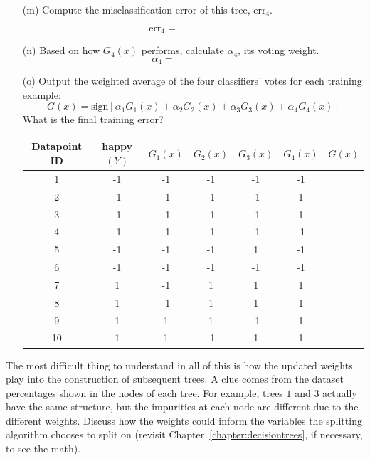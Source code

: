 \begin{enumerate}
\item[(m)] Compute the misclassification error of this tree, $\text{err}_4$. 

$$ \text{err}_4 = \qquad \qquad \qquad $$
\vspace{3mm}

\item[(n)] Based on how $G_4(x)$ performs, calculate $\alpha_4$, its voting weight.
$$ \alpha_4 = \qquad \qquad \qquad $$

\item[(o)] Output the weighted average of the four classifiers' votes for each training example:
$$ G(x) = \text{sign}\left[ \alpha_1 G_1(x) + \alpha_2 G_2(x) + \alpha_3 G_3(x) + \alpha_4 G_4(x) \right] $$ 
What is the final training error? 
\vspace{3mm}
{\small
\begin{center}
\begin{tabular}{cccccc|c}
\toprule
Datapoint ID & happy $(Y)$ & $G_1(x)$ & $G_2(x)$ & $G_3(x)$ & $G_4(x)$ & $G(x)$ \\
\midrule
1 & -1 & -1 & -1 & -1 & -1 & \\
2 & -1 & -1 & -1 & -1 & 1 & \\
3 & -1 & -1 & -1 & -1 & 1 & \\
4 & -1 & -1 & -1 & -1 & -1 & \\
5 & -1 & -1 & -1 & 1 & -1 & \\
6 & -1 & -1 & -1 & -1 & -1 & \\
\midrule
7 & 1 & -1 & 1 & 1 & 1 & \\
8 & 1 & -1 & 1 & 1 & 1 & \\
9 & 1 & 1 & 1 & -1 & 1 & \\
10 & 1 & 1 & -1 & 1 & 1 & \\
\bottomrule
\end{tabular}
\end{center}
}
\end{enumerate} 

\vspace{3mm}

\begin{question}{}
The most difficult thing to understand in all of this is how the updated weights play into the construction of subsequent trees. A clue comes from the dataset percentages shown in the nodes of each tree. For example, trees $1$ and $3$ actually have the same structure, but the impurities at each node are different due to the different weights. Discuss how the weights could inform the variables the splitting algorithm chooses to split on (revisit Chapter~\ref{chapter:decisiontrees}, if necessary, to see the math). 
\end{question}

